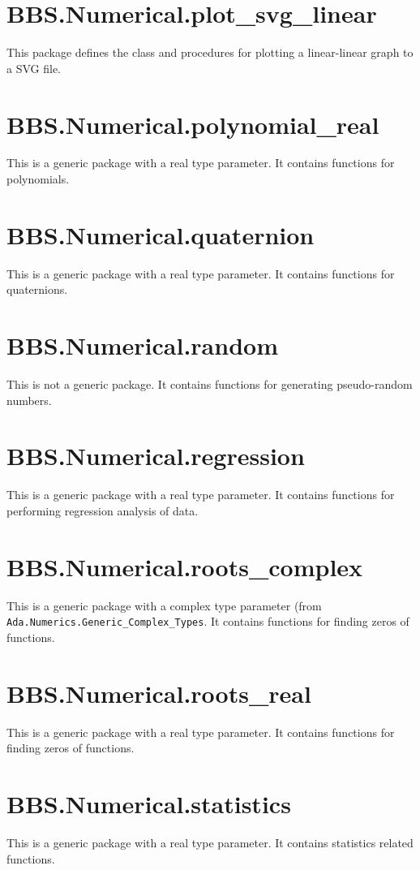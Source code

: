 \documentclass[10pt, openany]{book}
\newcommand{\package}[1]{\texttt{#1}}
\begin{document}
\section{BBS.Numerical.plot\_svg\_linear}
This package defines the class and procedures for plotting a linear-linear graph to a SVG file.

\section{BBS.Numerical.polynomial\_real}
This is a generic package with a real type parameter.  It contains functions for polynomials.

\section{BBS.Numerical.quaternion}
This is a generic package with a real type parameter.  It contains functions for quaternions.

\section{BBS.Numerical.random}
This is not a generic package.  It contains functions for generating pseudo-random numbers.

\section{BBS.Numerical.regression}
This is a generic package with a real type parameter.  It contains functions for performing regression analysis of data.

\section{BBS.Numerical.roots\_complex}
This is a generic package with a complex type parameter (from \package{Ada.Numerics.Generic\_Complex\_Types}.  It contains functions for finding zeros of functions.

\section{BBS.Numerical.roots\_real}
This is a generic package with a real type parameter.  It contains functions for finding zeros of functions.

\section{BBS.Numerical.statistics}
This is a generic package with a real type parameter.  It contains statistics related functions.
\end{document}
